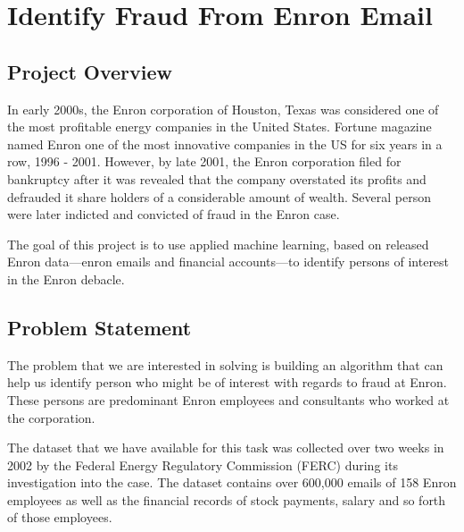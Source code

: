 \documentclass[twoside,openright,titlepage,numbers=noenddot,headinclude,%
               footinclude=true,cleardoublepage=empty,abstractoff,BCOR=5mm,%
               paper=a4,fontsize=11pt,ngerman,american]{scrreprt}
\numberwithin{theorem}{chapter}
\numberwithin{definition}{chapter}
\numberwithin{algorithm}{chapter}
\numberwithin{figure}{chapter}
\numberwithin{table}{chapter}
\numberwithin{equation}{chapter}
\begin{document}
\frenchspacing
\raggedbottom
{}
\pagestyle{plain}






\cleardoublepage


\chapter*{Identify Fraud From Enron Email}



\section*{Project Overview}

In early 2000s, the Enron corporation of Houston, Texas was considered one of the most profitable energy companies in the United States. Fortune magazine named Enron one of the most innovative companies in the US for six years in a row, 1996 - 2001. However, by late 2001, the Enron corporation filed for bankruptcy after it was revealed that the company overstated its profits and defrauded it share holders of a considerable amount of wealth. Several person were later indicted and convicted of fraud in the Enron case. 

The goal of this project is to use applied machine learning, based on released Enron data---enron emails and financial accounts---to identify persons of interest in the Enron debacle.


\section*{Problem Statement}

The problem that we are interested in solving is building an algorithm that can help us identify person who might be of interest with regards to fraud at Enron. These persons are predominant Enron employees and consultants who worked at the corporation. 

The dataset that we have available for this task was collected over two weeks in 2002 by the Federal Energy Regulatory Commission (FERC) during its investigation into the case. The dataset contains over 600,000 emails of 158 Enron employees as well as the financial records of stock payments, salary and so forth of those employees.
\end{document}
